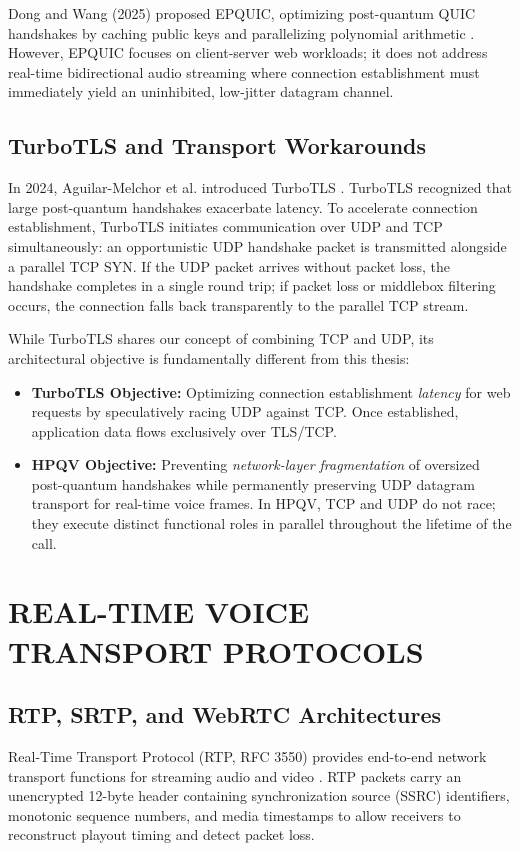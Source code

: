 Dong and Wang (2025) proposed EPQUIC, optimizing post-quantum QUIC handshakes by caching public keys and parallelizing polynomial arithmetic \cite{dong2025epquic}. However, EPQUIC focuses on client-server web workloads; it does not address real-time bidirectional audio streaming where connection establishment must immediately yield an uninhibited, low-jitter datagram channel.

\subsection{TurboTLS and Transport Workarounds}
In 2024, Aguilar-Melchor et al. introduced TurboTLS \cite{aguilar2024turbotls}. TurboTLS recognized that large post-quantum handshakes exacerbate latency. To accelerate connection establishment, TurboTLS initiates communication over UDP and TCP simultaneously: an opportunistic UDP handshake packet is transmitted alongside a parallel TCP SYN. If the UDP packet arrives without packet loss, the handshake completes in a single round trip; if packet loss or middlebox filtering occurs, the connection falls back transparently to the parallel TCP stream.

While TurboTLS shares our concept of combining TCP and UDP, its architectural objective is fundamentally different from this thesis:
\begin{itemize}
    \item \textbf{TurboTLS Objective:} Optimizing connection establishment \textit{latency} for web requests by speculatively racing UDP against TCP. Once established, application data flows exclusively over TLS/TCP.
    \item \textbf{HPQV Objective:} Preventing \textit{network-layer fragmentation} of oversized post-quantum handshakes while permanently preserving UDP datagram transport for real-time voice frames. In HPQV, TCP and UDP do not race; they execute distinct functional roles in parallel throughout the lifetime of the call.
\end{itemize}

\section{REAL-TIME VOICE TRANSPORT PROTOCOLS}

\subsection{RTP, SRTP, and WebRTC Architectures}
Real-Time Transport Protocol (RTP, RFC 3550) provides end-to-end network transport functions for streaming audio and video \cite{rfc3550}. RTP packets carry an unencrypted 12-byte header containing synchronization source (SSRC) identifiers, monotonic sequence numbers, and media timestamps to allow receivers to reconstruct playout timing and detect packet loss.


